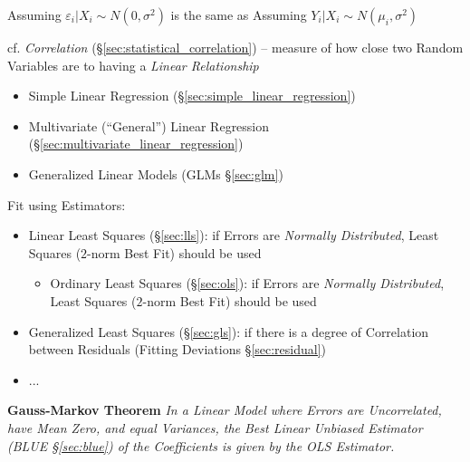 Assuming $\varepsilon_i | X_i \sim N(0, \sigma^2)$ is the same as Assuming
$Y_i | X_i \sim N(\mu_i, \sigma^2)$

cf. \emph{Correlation} (\S\ref{sec:statistical_correlation}) -- measure of how
close two Random Variables are to having a \emph{Linear Relationship}

\begin{itemize}
  \item Simple Linear Regression (\S\ref{sec:simple_linear_regression})
  \item Multivariate (``General'') Linear Regression
    (\S\ref{sec:multivariate_linear_regression})
  \item Generalized Linear Models (GLMs \S\ref{sec:glm})
\end{itemize}

Fit using Estimators:
\begin{itemize}
  \item Linear Least Squares (\S\ref{sec:lls}): if Errors are
    \emph{Normally Distributed}, Least Squares ($2$-norm Best Fit) should be
    used
    \begin{itemize}
      \item Ordinary Least Squares (\S\ref{sec:ols}): if Errors are
        \emph{Normally Distributed}, Least Squares ($2$-norm Best Fit) should be
        used
    \end{itemize}
  \item Generalized Least Squares (\S\ref{sec:gls}): if
    there is a degree of Correlation between Residuals (Fitting Deviations
    \S\ref{sec:residual})
  \item ...
\end{itemize}

\textbf{Gauss-Markov Theorem} \emph{
  In a Linear Model where Errors are Uncorrelated, have Mean Zero, and equal
  Variances, the Best Linear Unbiased Estimator (BLUE \S\ref{sec:blue}) of the
  Coefficients is given by the OLS Estimator.
}

